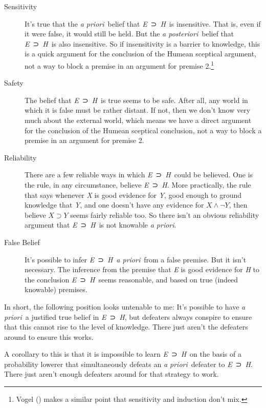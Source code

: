 \documentclass[
  10pt,
  letterpaper,
  DIV=11,
  numbers=noendperiod,
  twoside]{scrartcl}
\begin{document}
\begin{description}
\item[Sensitivity]
It's true that the \emph{a priori}~belief that \emph{E}~⊃~\emph{H}~is
insensitive. That is, even if it were false, it would still be held. But
the \emph{a posteriori}~belief that \emph{E}~⊃~\emph{H}~is also
insensitive. So if insensitivity is a barrier to knowledge, this is a
quick argument for the conclusion of the Humean sceptical argument, not
a way to block a premise in an argument for premise 2.\footnote{Vogel
  () makes a similar point that
  sensitivity and induction don't mix.}
\item[Safety]
The belief that \emph{E}~⊃~\emph{H}~is true seems to be safe. After all,
any world in which it is false must be rather distant. If not, then we
don't know very much about the external world, which means we have a
direct argument for the conclusion of the Humean sceptical conclusion,
not a way to block a premise in an argument for premise 2.
\item[Reliability]
There are a few reliable ways in which \emph{E}~⊃~\emph{H}~could be
believed. One is the rule, in any circumstance, believe
\emph{E}~⊃~\emph{H}. More practically, the rule that says whenever
\emph{X} is good evidence for \emph{Y}, good enough to ground knowledge
that \emph{Y}, and one doesn't have any evidence for
\(X \wedge \neg Y\), then believe \(X \supset Y\) seems fairly reliable
too. So there isn't an obvious reliability argument that
\emph{E}~⊃~\emph{H}~is not knowable \emph{a priori}.
\item[False Belief]
It's possible to infer \emph{E}~⊃~\emph{H}~\emph{a priori}~from a false
premise. But it isn't necessary. The inference from the premise that
\emph{E} is good evidence for \emph{H} to the conclusion
\emph{E}~⊃~\emph{H}~seems reasonable, and based on true (indeed
knowable) premises.
\end{description}

In short, the following position looks untenable to me: It's possible to
have \emph{a priori}~a justified true belief in \emph{E}~⊃~\emph{H}, but
defeaters always conspire to ensure that this cannot rise to the level
of knowledge. There just aren't the defeaters around to ensure this
works.

A corollary to this is that it is impossible to learn
\emph{E}~⊃~\emph{H}~on the basis of a probability lowerer that
simultaneously defeats an \emph{a priori}~defeater to
\emph{E}~⊃~\emph{H}. There just aren't enough defeaters around for that
strategy to work.
\end{document}
